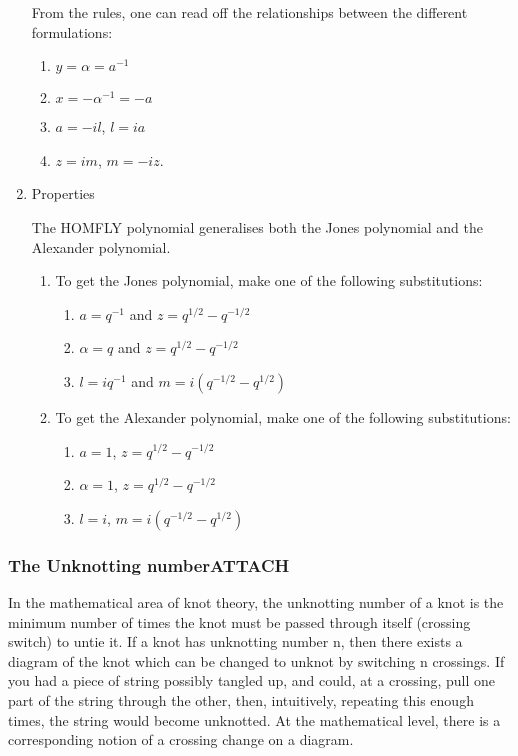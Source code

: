 \documentclass[a4paper]{article}
\begin{document}
\begin{enumerate}
From the rules, one can read off the relationships between the different formulations:

\begin{enumerate}
\item \(y = \alpha = a^{-1}\)
\item \(x = - \alpha^{-1} = -a\)
\item \(a = - i l\), \(l = i a\)
\item \(z = i m\), \(m = - i z\).
\end{enumerate}


\item Properties
\label{sec:org5da9430}

The HOMFLY polynomial generalises both the Jones polynomial and the Alexander polynomial.

\begin{enumerate}
\item To get the Jones polynomial, make one of the following substitutions:
\label{sec:orgd462e8e}

\begin{enumerate}
\item \(a = q^{-1}\) and \(z = q^{1/2} - q^{-1/2}\)
\item \(\alpha = q\) and \(z = q^{1/2} - q^{-1/2}\)
\item \(l = i q^{-1}\) and \(m = i (q^{-1/2} - q^{1/2})\)
\end{enumerate}

\item To get the Alexander polynomial, make one of the following substitutions:
\label{sec:orgc36748b}

\begin{enumerate}
\item \(a = 1\), \(z = q^{1/2} - q^{-1/2}\)
\item \(\alpha = 1\), \(z = q^{1/2} - q^{-1/2}\)
\item \(l = i\), \(m = i (q^{-1/2} - q^{1/2})\)
\end{enumerate}
\end{enumerate}
\end{enumerate}
\subsubsection{The Unknotting number\hfill{}\textsc{ATTACH}}
\label{sec:org34ea201}
In the mathematical area of knot theory, the unknotting number of a knot is the minimum number of times the knot must be passed through itself (crossing switch) to untie it. If a knot has unknotting number n, then there exists a diagram of the knot which can be changed to unknot by switching n crossings.
If you had a piece of string possibly tangled up, and could, at a crossing, pull one part of the string through the other, then, intuitively, repeating this enough times, the string would become unknotted. At the mathematical level, there is a corresponding notion of a crossing change on a diagram.
\end{document}
